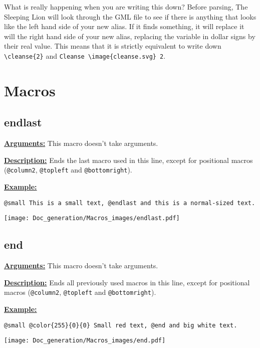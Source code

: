 \documentclass{article}
\begin{document}
What is really happening when you are writing this down? Before parsing, The Sleeping Lion will look through the GML file to see if there is anything that looks like the left hand side of your new alias. If it finds something, it will replace it will the right hand side of your new alias, replacing the variable in dollar signs by their real value. This means that it is strictly equivalent to write down \verb`\cleanse{2}` and \verb`Cleanse \image{cleanse.svg} 2`.

\pagebreak

\section{Macros}

\subsection{endlast}
\textbf{\underline{Arguments:}} This macro doesn't take arguments.

\textbf{\underline{Description:}} Ends the last macro used in this line, except for positional macros (\verb`@column2`, \verb`@topleft` and \verb`@bottomright`).

\textbf{\underline{Example:}}

\begin{BVerbatim}
@small This is a small text, @endlast and this is a normal-sized text.
\end{BVerbatim}

\begin{center}
\texttt{[image: Doc\_generation/Macros\_images/endlast.pdf]}
\end{center}

\subsection{end}
\textbf{\underline{Arguments:}} This macro doesn't take arguments.

\textbf{\underline{Description:}} Ends all previously used macros in this line, except for positional macros (\verb`@column2`, \verb`@topleft` and \verb`@bottomright`). 

\textbf{\underline{Example:}}

\begin{center}
\begin{BVerbatim}
@small @color{255}{0}{0} Small red text, @end and big white text.
\end{BVerbatim}

\texttt{[image: Doc\_generation/Macros\_images/end.pdf]}
\end{center}
\end{document}
